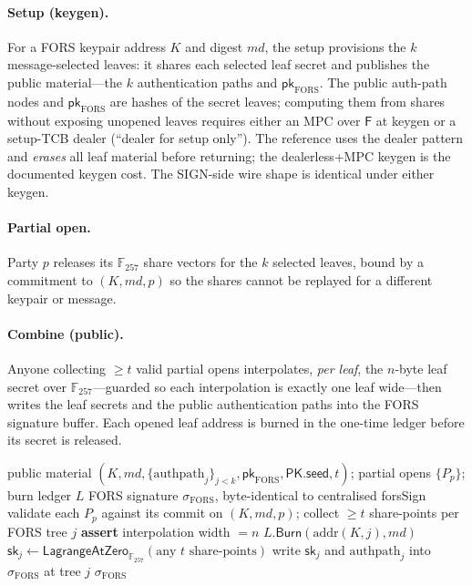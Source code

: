 \documentclass[11pt,a4paper]{article}
\newcommand{\Fhash}{\mathsf{F}}
\newcommand{\pkseed}{\mathsf{PK.seed}}
\newcommand{\GF}{\mathbb{F}}
\begin{document}
\paragraph{Setup (keygen).} For a FORS keypair address $K$ and digest $md$, the
setup provisions the $k$ message-selected leaves: it shares each selected leaf secret
and publishes the public material---the $k$ authentication paths and
$\mathsf{pk}_{\mathrm{FORS}}$. The public auth-path nodes and $\mathsf{pk}_{\mathrm{
FORS}}$ are hashes of the secret leaves; computing them from shares without exposing
unopened leaves requires either an MPC over $\Fhash$ at keygen or a setup-TCB dealer
(``dealer for setup only''). The reference uses the dealer pattern and \emph{erases}
all leaf material before returning; the dealerless+MPC keygen is the documented
keygen cost. The SIGN-side wire shape is identical under either keygen.

\paragraph{Partial open.} Party $p$ releases its $\GF_{257}$ share vectors for the
$k$ selected leaves, bound by a commitment to $(K, md, p)$ so the shares cannot be
replayed for a different keypair or message.

\paragraph{Combine (public).} Anyone collecting $\geq t$ valid partial opens
interpolates, \emph{per leaf}, the $n$-byte leaf secret over $\GF_{257}$---guarded so
each interpolation is exactly one leaf wide---then writes the leaf secrets and the
public authentication paths into the FORS signature buffer. Each opened leaf address
is burned in the one-time ledger before its secret is released.

\begin{algorithm}[H]
\caption{$\mathsf{OpenForsThreshold}$ (public combiner, no-reconstruct)}
\label{alg:open}
\begin{algorithmic}[1]
\Require public material $(K, md, \{\text{authpath}_j\}_{j<k}, \mathsf{pk}_{\mathrm{FORS}}, \pkseed, t)$; partial opens $\{P_p\}$; burn ledger $L$
\Ensure FORS signature $\sigma_{\mathrm{FORS}}$, byte-identical to centralised \textsf{forsSign}
\State validate each $P_p$ against its commit on $(K, md, p)$; collect $\geq t$ share-points per FORS tree $j$
  \State \textbf{assert} interpolation width $=n$ 
  \State $L.\mathsf{Burn}(\mathrm{addr}(K,j), md)$ 
  \State $\mathsf{sk}_j \gets \mathsf{LagrangeAtZero}_{\GF_{257}}(\text{any } t \text{ share-points})$ 
  \State write $\mathsf{sk}_j$ and $\text{authpath}_j$ into $\sigma_{\mathrm{FORS}}$ at tree $j$
\EndFor
\State \Return $\sigma_{\mathrm{FORS}}$
\end{algorithmic}
\end{algorithm}
\end{document}
